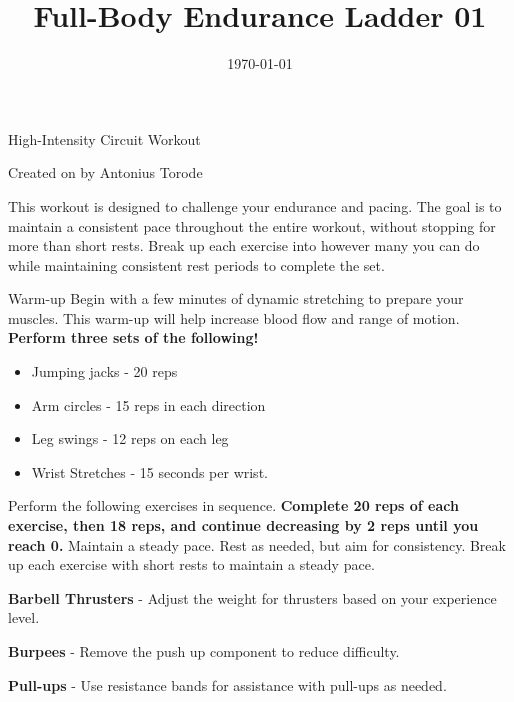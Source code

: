\documentclass{article}
\newcounter{workout}
\newcounter{exercise}
\renewcommand{\maketitle}{
	\begin{center}
		{\Huge\bfseries\thetitle}
		
		\vspace{0.5em}
		
		High-Intensity Circuit Workout
		
		\vspace{0.5em}
		
		Created on \thedate\hspace{0.5em}by Antonius Torode
	\end{center}
}
\begin{document}
	\begin{tcolorbox}[colback=gray!15,colframe=black,enforce breakable,pad at break*=5mm,boxrule=0.5mm]
		
		\title{Full-Body Endurance Ladder 01}
		\date{\today}
		\maketitle
		
		This workout is designed to challenge your endurance and pacing. The goal is to maintain a consistent pace throughout the entire workout, without stopping for more than short rests. Break up each exercise into however many you can do while maintaining consistent rest periods to complete the set. 
		
		\begin{workoutbox}{Warm-up}
			Begin with a few minutes of dynamic stretching to prepare your muscles. This warm-up will help increase blood flow and range of motion. \textbf{Perform three sets of the following!}
			
			\begin{itemize}[label=\textcolor{blue!70}{\textbullet}, itemsep=0pt]
				\item Jumping jacks - 20 reps
				\item Arm circles - 15 reps in each direction
				\item Leg swings - 12 reps on each leg
				\item Wrist Stretches - 15 seconds per wrist.
			\end{itemize}
		\end{workoutbox}
		
		Perform the following exercises in sequence. \textbf{Complete 20 reps of each exercise, then 18 reps, and continue decreasing by 2 reps until you reach 0.} Maintain a steady pace. Rest as needed, but aim for consistency. Break up each exercise with short rests to maintain a steady pace.
		
		\begin{exercisebox}
			\textbf{Barbell Thrusters} - Adjust the weight for thrusters based on your experience level.
		\end{exercisebox}
		
		\begin{exercisebox}
			\textbf{Burpees} - Remove the push up component to reduce difficulty.
		\end{exercisebox}
		
		\begin{exercisebox}
			\textbf{Pull-ups} - Use resistance bands for assistance with pull-ups as needed. 
		\end{exercisebox}
		

\end{tcolorbox}
\end{document}
